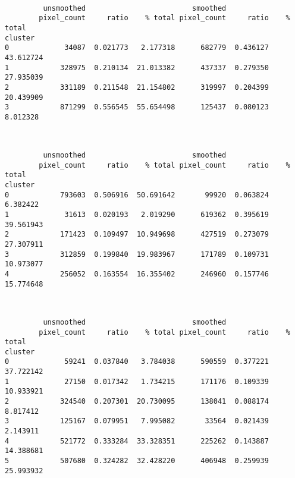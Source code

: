 \documentclass[11pt]{article}
\begin{document}
    
    \begin{center}
    \end{center}
    { \hspace*{\fill} \\}
    
    
    \begin{verbatim}
         unsmoothed                         smoothed                     
        pixel_count     ratio    % total pixel_count     ratio    % total
cluster                                                                  
0             34087  0.021773   2.177318      682779  0.436127  43.612724
1            328975  0.210134  21.013382      437337  0.279350  27.935039
2            331189  0.211548  21.154802      319997  0.204399  20.439909
3            871299  0.556545  55.654498      125437  0.080123   8.012328
    \end{verbatim}

    
    \begin{center}
    \end{center}
    { \hspace*{\fill} \\}
    
    
    \begin{verbatim}
         unsmoothed                         smoothed                     
        pixel_count     ratio    % total pixel_count     ratio    % total
cluster                                                                  
0            793603  0.506916  50.691642       99920  0.063824   6.382422
1             31613  0.020193   2.019290      619362  0.395619  39.561943
2            171423  0.109497  10.949698      427519  0.273079  27.307911
3            312859  0.199840  19.983967      171789  0.109731  10.973077
4            256052  0.163554  16.355402      246960  0.157746  15.774648
    \end{verbatim}

    
    \begin{center}
    \end{center}
    { \hspace*{\fill} \\}
    
    
    \begin{verbatim}
         unsmoothed                         smoothed                     
        pixel_count     ratio    % total pixel_count     ratio    % total
cluster                                                                  
0             59241  0.037840   3.784038      590559  0.377221  37.722142
1             27150  0.017342   1.734215      171176  0.109339  10.933921
2            324540  0.207301  20.730095      138041  0.088174   8.817412
3            125167  0.079951   7.995082       33564  0.021439   2.143911
4            521772  0.333284  33.328351      225262  0.143887  14.388681
5            507680  0.324282  32.428220      406948  0.259939  25.993932
    \end{verbatim}
\end{document}
